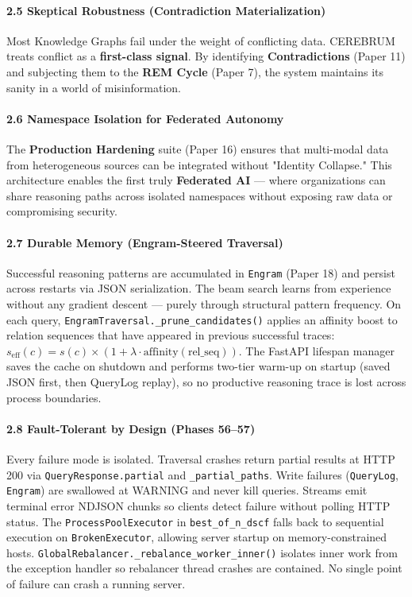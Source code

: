 \paragraph{2.5 Skeptical Robustness (Contra\-diction Materi\-alization)}
Most Knowledge Graphs fail under the weight of conflicting data. CEREBRUM treats conflict as a \textbf{first-class signal}. By identifying \textbf{Contra\-dictions} (Paper 11) and subjecting them to the \textbf{REM Cycle} (Paper 7), the system maintains its sanity in a world of misin\-formation.

\paragraph{2.6 Namespace Isolation for Federated Autonomy}
The \textbf{Production Hardening} suite (Paper 16) ensures that multi-modal data from heter\-ogeneous sources can be integrated without "Identity Collapse." This archi\-tecture enables the first truly \textbf{Federated AI} — where organ\-izations can share reasoning paths across isolated namespaces without exposing raw data or compr\-omising security.

\paragraph{2.7 Durable Memory (Engram-Steered Traversal)}
Successful reasoning patterns are accumulated in \texttt{Engram} (Paper 18) and persist across restarts via JSON seria\-lization. The beam search learns from experience without any gradient descent — purely through structural pattern frequency. On each query, \texttt{EngramTraversal.\_prune\_candidates()} applies an affinity boost to relation sequences that have appeared in previous successful traces: $s_\text{eff}(c) = s(c) \times (1 + \lambda \cdot \text{affinity}(\text{rel\_seq}))$. The FastAPI lifespan manager saves the cache on shutdown and performs two-tier warm-up on startup (saved JSON first, then QueryLog replay), so no productive reasoning trace is lost across process boundaries.

\paragraph{2.8 Fault-Tolerant by Design (Phases 56–57)}
Every failure mode is isolated. Traversal crashes return partial results at HTTP 200 via \texttt{QueryResponse.partial} and \texttt{\_partial\_paths}. Write failures (\texttt{QueryLog}, \texttt{Engram}) are swallowed at WARNING and never kill queries. Streams emit terminal error NDJSON chunks so clients detect failure without polling HTTP status. The \texttt{ProcessPoolExecutor} in \texttt{best\_of\_n\_dscf} falls back to sequential execution on \texttt{BrokenExecutor}, allowing server startup on memory-constrained hosts. \texttt{GlobalRebalancer.\_rebalance\_worker\_inner()} isolates inner work from the exception handler so rebalancer thread crashes are contained. No single point of failure can crash a running server.

